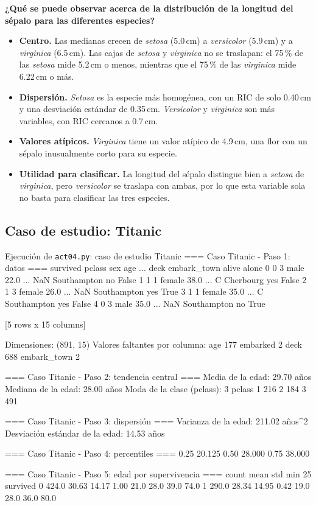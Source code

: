 \documentclass[11pt,letterpaper]{article}
\begin{document}
\textbf{¿Qué se puede observar acerca de la distribución de la longitud del sépalo para las diferentes especies?}

\begin{itemize}
    \item \textbf{Centro.} Las medianas crecen de \textit{setosa} (5.0\,cm) a \textit{versicolor} (5.9\,cm) y a \textit{virginica} (6.5\,cm). Las cajas de \textit{setosa} y \textit{virginica} no se traslapan: el 75\,\% de las \textit{setosa} mide 5.2\,cm o menos, mientras que el 75\,\% de las \textit{virginica} mide 6.22\,cm o más.
    \item \textbf{Dispersión.} \textit{Setosa} es la especie más homogénea, con un RIC de solo 0.40\,cm y una desviación estándar de 0.35\,cm. \textit{Versicolor} y \textit{virginica} son más variables, con RIC cercanos a 0.7\,cm.
    \item \textbf{Valores atípicos.} \textit{Virginica} tiene un valor atípico de 4.9\,cm, una flor con un sépalo inusualmente corto para su especie.
    \item \textbf{Utilidad para clasificar.} La longitud del sépalo distingue bien a \textit{setosa} de \textit{virginica}, pero \textit{versicolor} se traslapa con ambas, por lo que esta variable sola no basta para clasificar las tres especies.
\end{itemize}

\subsection{Caso de estudio: Titanic}

\begin{consola}[label=out:titanic]{Ejecución de \texttt{act04.py}: caso de estudio Titanic}
=== Caso Titanic - Paso 1: datos ===
   survived  pclass     sex   age  ...  deck  embark_town  alive  alone
0         0       3    male  22.0  ...   NaN  Southampton     no  False
1         1       1  female  38.0  ...     C    Cherbourg    yes  False
2         1       3  female  26.0  ...   NaN  Southampton    yes   True
3         1       1  female  35.0  ...     C  Southampton    yes  False
4         0       3    male  35.0  ...   NaN  Southampton     no   True

[5 rows x 15 columns]

Dimensiones: (891, 15)
Valores faltantes por columna:
age            177
embarked         2
deck           688
embark_town      2

=== Caso Titanic - Paso 2: tendencia central ===
Media de la edad: 29.70 años
Mediana de la edad: 28.00 años
Moda de la clase (pclass): 3
pclass
1    216
2    184
3    491

=== Caso Titanic - Paso 3: dispersión ===
Varianza de la edad: 211.02 años^2
Desviación estándar de la edad: 14.53 años

=== Caso Titanic - Paso 4: percentiles ===
0.25    20.125
0.50    28.000
0.75    38.000

=== Caso Titanic - Paso 5: edad por supervivencia ===
          count   mean    std   min   25%
survived
0         424.0  30.63  14.17  1.00  21.0  28.0  39.0  74.0
1         290.0  28.34  14.95  0.42  19.0  28.0  36.0  80.0
\end{consola}
\end{document}
